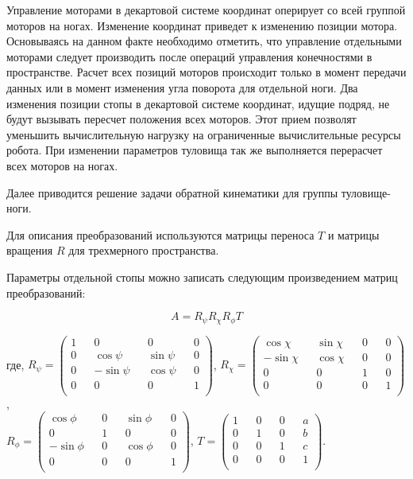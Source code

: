 Управление моторами в декартовой системе координат оперирует со всей группой моторов на ногах. Изменение координат приведет к изменению позиции мотора. Основываясь на данном факте необходимо отметить, что управление отдельными моторами следует производить после операций управления конечностями в пространстве. Расчет всех позиций моторов происходит только в момент передачи данных или в момент изменения угла поворота для отдельной ноги. Два изменения позиции стопы в декартовой системе координат, идущие подряд, не будут вызывать пересчет положения всех моторов. Этот прием позволят уменьшить вычислительную нагрузку на ограниченные вычислительные ресурсы робота. При изменении параметров туловища  так же выполняется перерасчет всех моторов на ногах.

Далее приводится решение задачи обратной кинематики для группы туловище-ноги. 

Для описания преобразований используются матрицы переноса $T$ и матрицы вращения $R$ для трехмерного пространства.

Параметры отдельной стопы можно записать следующим произведением матриц преобразований:

$$
A = R_{\psi} R_{\chi} R_{\phi} T
$$

\noindent где,
$ R_{\psi} = \begin{pmatrix}
1 && 0 && 0 && 0 \\
0 && \cos \psi &&  \sin \psi && 0 \\
0 && -\sin \psi && \cos \psi && 0 \\
0 && 0 && 0 && 1 \\
\end{pmatrix}$,
$ R_{\chi} = \begin{pmatrix}
\cos \chi &&  \sin \chi && 0 && 0 \\
-\sin \chi && \cos \chi && 0 && 0 \\
0 && 0 && 1 && 0 \\
0 && 0 && 0 && 1 \\
\end{pmatrix}$, \\
$ R_{\phi} = \begin{pmatrix}
\cos \phi &&  0 && \sin \phi && 0 \\
0 && 1 && 0 && 0 \\
-\sin \phi && 0 && \cos \phi && 0 \\
0 && 0 && 0 && 1 \\
\end{pmatrix}$,
$ T = \begin{pmatrix}
1 && 0 && 0 && a \\
0 && 1 && 0 && b \\
0 && 0 && 1 && c \\
0 && 0 && 0 && 1 \\
\end{pmatrix}$.

